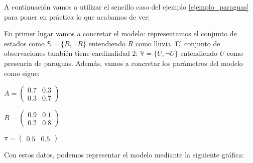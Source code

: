 A continuación vamos a utilizar el sencillo caso del ejemplo \ref{ejemplo_paraguas} para poner en práctica lo que acabamos de ver:
\begin{exampleth} \label{ejemplo_paraguasSol1}
En primer lugar vamos a concretar el modelo: representamos el conjunto de estados como $\mathbb{S}=\{R,\neg R\}$ entendiendo $R$ como lluvia. El conjunto de observaciones también tiene cardinalidad $2$: $\mathbb{V}=\{U,\neg U\}$ entendiendo $U$ como presencia de paraguas. Además, vamos a concretar los parámetros del modelo como sigue:
\begin{center}
    $A=\begin{pmatrix}
    0.7 & 0.3\\
    0.3 & 0.7
    \end{pmatrix}$
\end{center}
\begin{center}
    $B=\begin{pmatrix}
    0.9 & 0.1 \\
    0.2 & 0.8
    \end{pmatrix}$
\end{center}
\begin{center}
    $\pi=\begin{pmatrix}
    0.5 & 0.5
    \end{pmatrix}$
\end{center}
Con estos datos, podemos representar el modelo mediante la siguiente gráfica:

\begin{figure}[H]
\centering
{}
\end{figure}


\end{exampleth}
